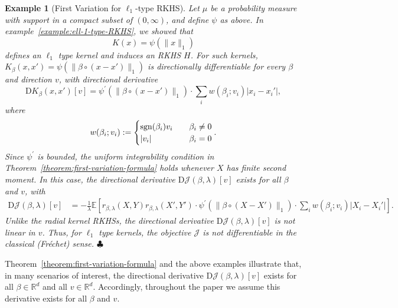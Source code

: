 \documentclass[sn-mathphys-num]{sn-jnl}%
\numberwithin{equation}{section}
\newcommand{\R}{\mathbb{R}}
\newcommand{\E}{\mathbb{E}}
\newcommand{\kernel}{K}
\newcommand{\profile}{\psi}
\theoremstyle{thmstyleone}%
\theoremstyle{thmstyletwo}%
\newtheorem{example}{Example}%
\theoremstyle{thmstylethree}%
\begin{document}
\vspace{.5em} 
\begin{example} [First Variation for $\ell_1$-type RKHS]
\label{example:first-variation-for-ell-one-type-RKHS}
\emph{
 Let $\mu$ be a probability measure with support in a compact subset of $(0, \infty)$, and define 
$\profile$ as above. In example~\ref{example:ell-1-type-RKHS}, we showed that 
\begin{equation*}
	\kernel(x) = \profile(\|x\|_1) 
\end{equation*}
defines an $\ell_1$ type kernel and induces an RKHS $H$. %
For such kernels, $\kernel_\beta(x, x') = \profile(\|\beta \circ (x - x')\|_1)$ is directionally differentiable for every $\beta$ and direction $v$, with directional derivative
\begin{equation*}
	\mathrm{D} \kernel_\beta(x, x')[v] = \profile^\prime(\|\beta \circ (x - x')\|_1) \cdot \sum_i w(\beta_i; v_i)|x_i - x_i'|,
\end{equation*}
where 
\begin{equation*}
	w(\beta_i; v_i) := \begin{cases}
		{\rm sgn}(\beta_i) v_i~~~&\beta_i \ne 0\\
		|v_i|~~~&\beta_i = 0
	\end{cases}.
\end{equation*}
Since $\profile^\prime$ is bounded, the uniform integrability condition in Theorem~\ref{theorem:first-variation-formula} holds whenever $X$ has finite second moment. In this case, the directional derivative $\mathrm{D} \mathcal{J}(\beta, \lambda)[v]$ exists for all $\beta$ and $v$, with 
\begin{equation*}
\begin{split} 
	\mathrm{D} \mathcal{J}(\beta, \lambda)[v] %
	&= -\frac{1}{\lambda} 
		\E[r_{\beta, \lambda}(X, Y) r_{\beta, \lambda}(X', Y') \cdot \profile^\prime(\|\beta \circ (X - X')\|_1) \cdot \sum_i w(\beta_i; v_i)|X_i - X_i'|].
\end{split} 
\end{equation*}
Unlike the radial kernel RKHSs, the directional derivative 
$\mathrm{D} \mathcal{J}(\beta, \lambda)[v]$ is \emph{not} linear in $v$. 
Thus, for $\ell_1$ type kernels, the objective $\mathcal{J}$ is not differentiable in the classical (Fr\'echet) sense.
}  $\clubsuit$
\end{example}
Theorem~\ref{theorem:first-variation-formula} and the above examples illustrate that, in many scenarios of interest, 
the directional derivative $\mathrm{D} \mathcal{J}(\beta, \lambda)[v]$ exists for all $\beta \in \R^d$ and all $v \in \R^d$. 
Accordingly, throughout the paper we assume this derivative exists for all $\beta$ and $v$.
\end{document}
